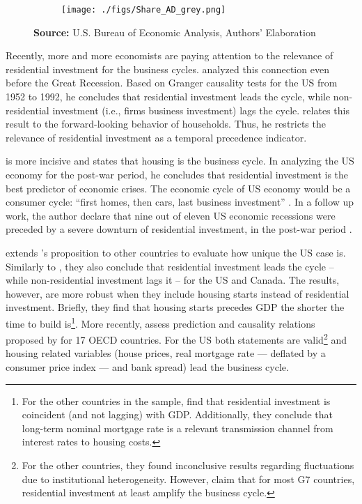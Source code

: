 \documentclass[12pt, a4paper]{article}
\begin{document}
\begin{figure}[H]
    \centering
	\caption{Expenditures share on GDP}
	\label{fig:share}
\begin{figure}[htb]
    \texttt{[image: ./figs/Share\_AD\_grey.png]}
    \end{figure}
	\caption*{\textbf{Source:} U.S. Bureau of Economic Analysis, Authors' Elaboration}
\end{figure}

Recently, more and more economists are paying attention to the relevance of residential investment for the business cycles.
\textcite{green_follow_1997} analyzed this connection even before the Great Recession.
Based on Granger causality tests for the US from 1952 to 1992, he concludes that residential investment leads the cycle, while non-residential investment (i.e., firms business investment) lags the cycle.
\textcite{green_follow_1997} relates this result to the forward-looking behavior of households.
Thus, he restricts the relevance of residential investment as a temporal precedence indicator.

\textcite{leamer_housing_2007} is more incisive and states that housing is the business cycle.
In analyzing the US economy for the post-war period, he concludes that residential investment is the best predictor of economic crises.
The economic cycle of US economy would be a consumer cycle: ``first homes, then cars, last business investment'' \cite[p.~8]{leamer_housing_2007}.
In a follow up work, the author declare that nine out of eleven US economic recessions were preceded by a severe downturn of residential investment, in the post-war period \cite{leamer_housing_2015}.

\textcite{kydland_2016_housing} extends \citeauthor*{leamer_housing_2007}'s \citeyear{leamer_housing_2007} proposition to other countries to evaluate how unique the US case is.
Similarly to \textcite{green_follow_1997}, they also conclude that residential investment leads the cycle -- while non-residential investment lags it -- for the US and Canada.
The results, however, are more robust when they include housing starts instead of residential investment.
Briefly, they find that housing starts precedes GDP the shorter the time to build is\footnote{For the other countries in the sample, \textcite{kydland_2016_housing} find that residential investment is coincident (and not lagging) with GDP. Additionally, they conclude that long-term nominal mortgage rate is a relevant transmission channel from interest rates to housing costs.}.
More recently, \textcite{huang_is_2018} assess  prediction and causality relations proposed by \textcite{leamer_housing_2007} for 17 OECD countries.
For the US both statements are valid\footnote{For the other countries, they found inconclusive results regarding fluctuations due to institutional heterogeneity. However, \textcite{huang_is_2018} claim that for most G7 countries, residential investment at least amplify the business cycle.} and housing related variables (house prices, real mortgage rate --- deflated by a consumer price index --- and bank spread) lead the business cycle.
\end{document}
